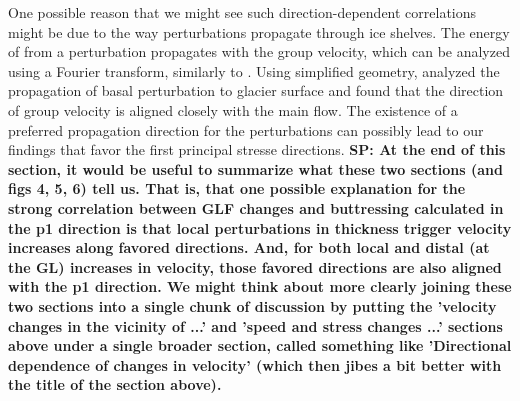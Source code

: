 \documentclass[tc, manuscript]{copernicus}
\begin{document}
One possible reason that we might see such direction-dependent correlations might be due to the way perturbations propagate through ice shelves. The energy of from a perturbation propagates with the group velocity, which can be analyzed using a Fourier transform, similarly to \citet{gudmundsson2003}. Using simplified geometry, \citet{gudmundsson2003} analyzed the propagation of basal perturbation to glacier surface and found that the direction of group velocity is aligned closely with the main flow. The existence of a preferred propagation direction for the perturbations can possibly lead to our findings that favor the first principal stresse directions. 
\textbf{SP: At the end of this section, it would be useful to summarize what these two sections (and figs 4, 5, 6) tell us. That is, that one possible explanation for the strong correlation between GLF changes and buttressing calculated in the p1 direction is that local perturbations in thickness trigger velocity increases along favored directions. And, for both local and distal (at the GL) increases in velocity, those favored directions are also aligned with the p1 direction. We might think about more clearly joining these two sections into a single chunk of discussion by putting the 'velocity changes in the vicinity of ...' and 'speed and stress changes ...' sections above under a single broader section, called something like 'Directional dependence of changes in velocity' (which then jibes a bit better with the title of the section above).}

\end{document}
